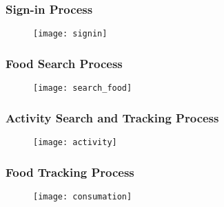 \newpage
\subsubsection{Sign-in Process}
\begin{figure}[H]
\centering
\texttt{[image: signin]}
\end{figure}


\newpage
\subsubsection{Food Search Process}
\begin{figure}[H]
\centering
\texttt{[image: search\_food]}
\end{figure}



\newpage
\subsubsection{Activity Search and Tracking Process}
\begin{figure}[H]
\centering
\texttt{[image: activity]}
\end{figure}



\newpage
\subsubsection{Food Tracking Process}
\begin{figure}[H]
\centering
\texttt{[image: consumation]}
\end{figure}